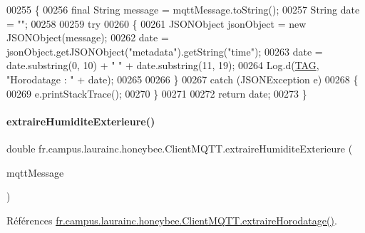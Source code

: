 \begin{DoxyCode}
00255     \{
00256         \textcolor{keyword}{final} String message = mqttMessage.toString();
00257         String date = \textcolor{stringliteral}{""};
00258 
00259         \textcolor{keywordflow}{try}
00260         \{
00261             JSONObject jsonObject = \textcolor{keyword}{new} JSONObject(message);
00262             date = jsonObject.getJSONObject(\textcolor{stringliteral}{"metadata"}).getString(\textcolor{stringliteral}{"time"});
00263             date = date.substring(0, 10) + \textcolor{stringliteral}{" "} + date.substring(11, 19);
00264             Log.d(\hyperlink{classfr_1_1campus_1_1laurainc_1_1honeybee_1_1_client_m_q_t_t_a378324f705f8d7870c5f7be0cea02890}{TAG}, \textcolor{stringliteral}{"Horodatage : "} + date);
00265 
00266         \}
00267         \textcolor{keywordflow}{catch} (JSONException e)
00268         \{
00269             e.printStackTrace();
00270         \}
00271 
00272         \textcolor{keywordflow}{return}  date;
00273     \}
\end{DoxyCode}
\mbox{\label{classfr_1_1campus_1_1laurainc_1_1honeybee_1_1_client_m_q_t_t_a0a3be0588498643af9098ab70a7a837a}} 
\paragraph{\texorpdfstring{extraire\+Humidite\+Exterieure()}{extraireHumiditeExterieure()}}
{\footnotesize\ttfamily double fr.\+campus.\+laurainc.\+honeybee.\+Client\+M\+Q\+T\+T.\+extraire\+Humidite\+Exterieure (\begin{DoxyParamCaption}\item[{Mqtt\+Message}]{mqtt\+Message }\end{DoxyParamCaption})}



Références \hyperlink{classfr_1_1campus_1_1laurainc_1_1honeybee_1_1_client_m_q_t_t_ace17d633909a5be8035518b9a6b528c2}{fr.\+campus.\+laurainc.\+honeybee.\+Client\+M\+Q\+T\+T.\+extraire\+Horodatage()}.



